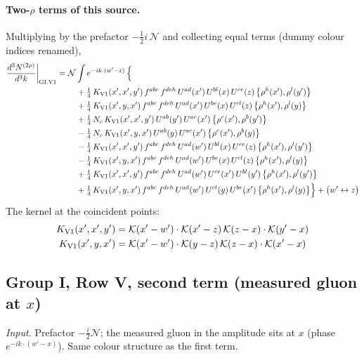 \documentclass[10pt]{article}
\numberwithin{equation}{section}
\newcommand{\KK}{\mathcal K}
\newcommand{\NN}{\mathcal N}
\begin{document}
\paragraph{Two-$\rho$ terms of this source.} Multiplying by the prefactor $-\tfrac12i\,\NN$ and collecting equal terms (dummy colour indices renamed),
\begin{align}
\frac{d^3N^{(2\rho)}}{d^3k}\bigg|_{\rm GI.V1}={}&\NN\int e^{-ik\cdot(w'-z)}\,\Big\{\notag\\
&\quad +\tfrac14\,K_{\rm V1}(x',x',y')\,f^{abc}\,f^{deh}\,U^{ad}(x')\,U^{bl}(x)\,U^{ce}(z)\,\big\{\rho^{h}(x'),\rho^{l}(y')\big\}\notag\\
&\quad +\tfrac14\,K_{\rm V1}(x',y,x')\,f^{abc}\,f^{deh}\,U^{ad}(x')\,U^{be}(x)\,U^{cl}(z)\,\big\{\rho^{h}(x'),\rho^{l}(y)\big\}\notag\\
&\quad +\tfrac14\,N_{c}\,K_{\rm V1}(x',x',y')\,U^{ab}(y')\,U^{ac}(x')\,\big\{\rho^{c}(x'),\rho^{b}(y')\big\}\notag\\
&\quad -\tfrac14\,N_{c}\,K_{\rm V1}(x',y,x')\,U^{ab}(y)\,U^{ac}(x')\,\big\{\rho^{c}(x'),\rho^{b}(y)\big\}\notag\\
&\quad -\tfrac14\,K_{\rm V1}(x',x',y')\,f^{abc}\,f^{deh}\,U^{ad}(w')\,U^{bl}(x)\,U^{ce}(z)\,\big\{\rho^{h}(x'),\rho^{l}(y')\big\}\notag\\
&\quad -\tfrac14\,K_{\rm V1}(x',y,x')\,f^{abc}\,f^{deh}\,U^{ad}(w')\,U^{be}(x)\,U^{cl}(z)\,\big\{\rho^{h}(x'),\rho^{l}(y)\big\}\notag\\
&\quad +\tfrac14\,K_{\rm V1}(x',x',y')\,f^{abc}\,f^{deh}\,U^{ad}(w')\,U^{ce}(x')\,U^{bl}(y')\,\big\{\rho^{h}(x'),\rho^{l}(y')\big\}\notag\\
&\quad +\tfrac14\,K_{\rm V1}(x',y,x')\,f^{abc}\,f^{deh}\,U^{ad}(w')\,U^{cl}(y)\,U^{be}(x')\,\big\{\rho^{h}(x'),\rho^{l}(y)\big\}\Big\}+\big(w'\leftrightarrow z\big)\label{R:eq:res-GI.V1}
\end{align}
The kernel at the coincident points:
\begin{align*}
K_{\rm V1}(x',x',y')&=\KK(x'-w')\cdot\KK(x'-z)\,\KK(z-x)\cdot\KK(y'-x)\\K_{\rm V1}(x',y,x')&=\KK(x'-w')\cdot\KK(y-z)\,\KK(z-x)\cdot\KK(x'-x)
\end{align*}
\subsection{Group I, Row V, second term (measured gluon at $x$)}\label{R:sec:GI.V2}
\emph{Input.} Prefactor $-\frac i2\NN$; the measured gluon in the amplitude sits at $x$ (phase $e^{-ik\cdot(w'-x)}$). Same colour structure as the first term.
\end{document}
